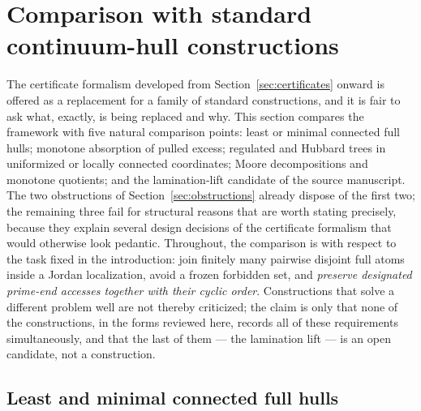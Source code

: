 \documentclass[11pt,reqno]{amsart}
\theoremstyle{definition}
\theoremstyle{remark}
\begin{document}

\section{Comparison with standard continuum-hull constructions}
\label{sec:comparison}

The certificate formalism developed from Section~\ref{sec:certificates}
onward is offered as a replacement for a family of standard constructions,
and it is fair to ask what, exactly, is being replaced and why.  This
section compares the framework with five natural comparison points:
least or minimal connected full hulls; monotone
absorption of pulled excess; regulated and Hubbard trees in uniformized or
locally connected coordinates; Moore decompositions and monotone
quotients; and the lamination-lift candidate of the source manuscript.
The two obstructions of Section~\ref{sec:obstructions} already dispose of
the first two; the remaining three fail for structural reasons that are
worth stating precisely, because they explain several design decisions of
the certificate formalism that would otherwise look pedantic.  Throughout,
the comparison is with respect to the task fixed in the introduction:
join finitely many pairwise disjoint full atoms inside a Jordan
localization, avoid a frozen forbidden set, and \emph{preserve designated
prime-end accesses together with their cyclic order}.  Constructions that
solve a different problem well are not thereby criticized; the claim is
only that none of the constructions, in the forms reviewed here, records
all of these requirements simultaneously, and that the last of them ---
the lamination lift --- is an open candidate, not a construction.

\subsection{Least and minimal connected full hulls}
\label{subsec:A-comp-least}
\end{document}
